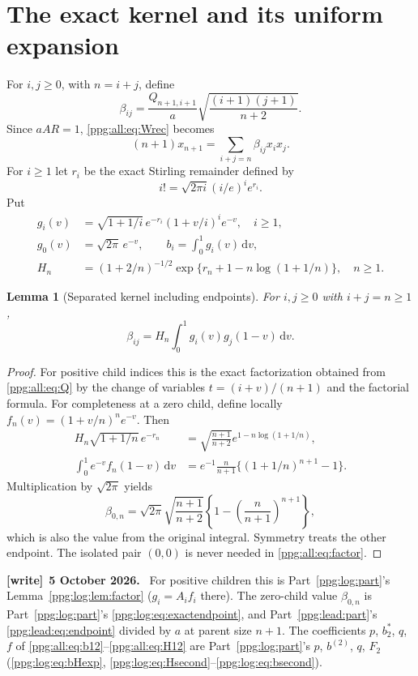 \documentclass[11pt,letterpaper]{article}
\newtheorem{lemma}[theorem]{Lemma}
\theoremstyle{remark}\newtheorem{remark}[theorem]{Remark}
\numberwithin{equation}{section}
\newcommand{\dd}{\mathrm d}
\newenvironment{writenote}[1][]{\par\smallskip\begingroup\small
 \noindent\textbf{[write]}\if\relax\detokenize{#1}\relax\else~\textbf{#1.}\fi\ }%
 {\par\endgroup\smallskip}
\begin{document}
\section{The exact kernel and its uniform expansion}\label{ppg:all:sec:kernel}
For $i,j\ge0$, with $n=i+j$, define
\begin{equation}\label{ppg:all:eq:beta}
 \beta_{ij}=\frac{Q_{n+1,i+1}}a
             \sqrt{\frac{(i+1)(j+1)}{n+2}}.
\end{equation}
Since $aAR=1$, \eqref{ppg:all:eq:Wrec} becomes
\begin{equation}\label{ppg:all:eq:xrec}
 (n+1)x_{n+1}=\sum_{i+j=n}\beta_{ij}x_ix_j.
\end{equation}
For $i\ge1$ let $r_i$ be the exact Stirling remainder defined by
\[
 i!=\sqrt{2\pi i}(i/e)^i e^{r_i}.
\]
Put
\begin{align}
 g_i(v)&=\sqrt{1+1/i}\,e^{-r_i}(1+v/i)^i e^{-v},\quad i\ge1,
 \label{ppg:all:eq:g}\\
 g_0(v)&=\sqrt{2\pi}\,e^{-v},\qquad
 b_i=\int_0^1g_i(v)\,\dd v,\label{ppg:all:eq:gzero}\\
 H_n&=(1+2/n)^{-1/2}\exp\{r_n+1-n\log(1+1/n)\},\quad n\ge1.
 \label{ppg:all:eq:H}
\end{align}

\begin{lemma}[Separated kernel including endpoints]\label{ppg:all:lem:factor}
For $i,j\ge0$ with $i+j=n\ge1$,
\begin{equation}\label{ppg:all:eq:factor}
 \beta_{ij}=H_n\int_0^1g_i(v)g_j(1-v)\,\dd v.
\end{equation}
\end{lemma}
\begin{proof}
For positive child indices this is the exact factorization obtained from \eqref{ppg:all:eq:Q} by the change of variables $t=(i+v)/(n+1)$ and the factorial formula. For completeness at a zero child, define locally
$f_n(v)=(1+v/n)^n e^{-v}$. Then
\begin{align*}
 H_n\sqrt{1+1/n}\,e^{-r_n}
 &=\sqrt{\frac{n+1}{n+2}}e^{1-n\log(1+1/n)},\\
 \int_0^1e^{-v}f_n(1-v)\,\dd v
 &=e^{-1}\frac n{n+1}\{(1+1/n)^{n+1}-1\}.
\end{align*}
Multiplication by $\sqrt{2\pi}$ yields
\[
 \beta_{0,n}=\sqrt{2\pi}\sqrt{\frac{n+1}{n+2}}
      \left\{1-\left(\frac n{n+1}\right)^{n+1}\right\},
\]
which is also the value from the original integral. Symmetry treats the other endpoint. The isolated pair $(0,0)$ is never needed in \eqref{ppg:all:eq:factor}.
\end{proof}
\begin{writenote}[5 October 2026]
For positive children this is Part~\ref{ppg:log:part}'s Lemma~\ref{ppg:log:lem:factor} ($g_i=A_if_i$ there). The zero-child value $\beta_{0,n}$ is Part~\ref{ppg:log:part}'s \eqref{ppg:log:eq:exactendpoint}, and Part~\ref{ppg:lead:part}'s \eqref{ppg:lead:eq:endpoint} divided by $a$ at parent size $n+1$. The coefficients $p$, $b_2^*$, $q$, $f$ of \eqref{ppg:all:eq:b12}--\eqref{ppg:all:eq:H12} are Part~\ref{ppg:log:part}'s $p$, $b^{(2)}$, $q$, $F_2$ (\eqref{ppg:log:eq:bHexp}, \eqref{ppg:log:eq:Hsecond}--\eqref{ppg:log:eq:bsecond}).
\end{writenote}
\end{document}
